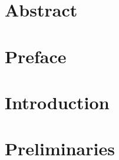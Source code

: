 \documentclass[a4paper,10pt,twoside]{report}
\author{\me}
\begin{document}


\normalsize


%

%

\chapter*{Abstract}\label{chapter:abstract}


\clearemptydoublepage

%



\chapter*{Preface}\label{chapter:preface}


\clearpage

\tableofcontents

\clearpage

\chapter{Introduction}\label{chapter:introduction}
\setcounter{page}{0}


\clearpage

\chapter{Preliminaries}\label{chapter:preliminaries}

\end{document}
